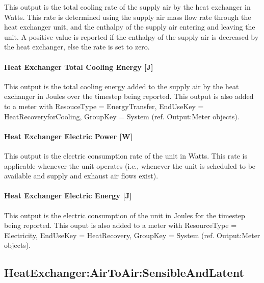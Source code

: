This output is the total cooling rate of the supply air by the heat exchanger in Watts. This rate is determined using the supply air mass flow rate through the heat exchanger unit, and the enthalpy of the supply air entering and leaving the unit. A positive value is reported if the enthalpy of the supply air is decreased by the heat exchanger, else the rate is set to zero.

\paragraph{Heat Exchanger Total Cooling Energy {[}J{]}}\label{heat-exchanger-total-cooling-energy-j}

This output is the total cooling energy added to the supply air by the heat exchanger in Joules over the timestep being reported. This output is also added to a meter with ResouceType = EnergyTransfer, EndUseKey = HeatRecoveryforCooling, GroupKey = System (ref. Output:Meter objects).

\paragraph{Heat Exchanger Electric Power {[}W{]}}\label{heat-exchanger-electric-power-w}

This output is the electric consumption rate of the unit in Watts. This rate is applicable whenever the unit operates (i.e., whenever the unit is scheduled to be available and supply and exhaust air flows exist).

\paragraph{Heat Exchanger Electric Energy {[}J{]}}\label{heat-exchanger-electric-energy-j}

This output is the electric consumption of the unit in Joules for the timestep being reported. This ouput is also added to a meter with ResourceType = Electricity, EndUseKey = HeatRecovery, GroupKey = System (ref. Output:Meter objects).

\subsection{HeatExchanger:AirToAir:SensibleAndLatent}\label{heatexchangerairtoairsensibleandlatent}

